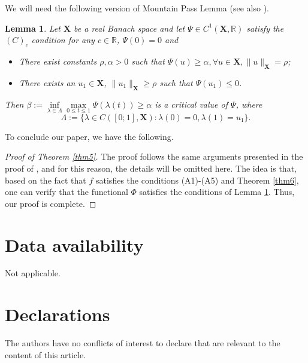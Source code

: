 \documentclass[10pt, reqno]{amsart}
\newtheorem{lemma}{Lemma}
\begin{document}
	We will need the following version of Mountain Pass Lemma (see also \cite{cer1, cer2}).
	
	\begin{lemma}\label{lem5}
		Let $\boldsymbol{X}$ be a real Banach space and let $\Psi \in C^1(\boldsymbol{X}, \mathbb{R})$ satisfy the $(C)_c$ condition for any $c \in \mathbb{R}$, $\Psi(0) = 0$ and
		\begin{itemize}
			\item[(i)] There exist constants $\rho, \alpha > 0$ such that $\Psi(u) \geq \alpha, \forall u \in \boldsymbol{X}, \|u\|_{\boldsymbol{X}} = \rho$; 
			\item[(ii)] There exists an $u_1 \in \boldsymbol{X}$, $\|u_1\|_{\boldsymbol{X}} \geq \rho$ such that $\Psi(u_1) \leq 0$.
		\end{itemize}
		Then $\beta := \inf\limits_{\lambda\in\Lambda}\max\limits_{0\leq t\leq1}\Psi(\lambda(t)) \geq \alpha$ is a critical value of $\Psi$, where
		$$\Lambda := \{\lambda \in C ([0; 1], \boldsymbol{X}) : \lambda(0) = 0, \lambda(1) = u_1\}.$$
	\end{lemma}
	
	To conclude our paper, we have the following.
	
	\begin{proof}[Proof of Theorem \ref{thm5}]
		The proof follows the same arguments presented in the proof of \cite[Theorem 4.3]{Luyen2}, and for this reason, the details will be omitted here. The idea is that, based on the fact that $f$ satisfies the conditions (A1)-(A5) and Theorem \ref{thm6}, one can verify that the functional $\Phi$ satisfies the conditions of Lemma \ref{lem5}. Thus, our proof is complete. 
	\end{proof}
	
	\section*{Data availability}
	Not applicable.
	
	\section*{Declarations}
	The authors have no conflicts of interest to declare that are relevant to the content of this article.
	
\end{document}
